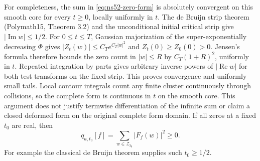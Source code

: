 For completeness, the sum in \eqref{eq:ns52-zero-form} is absolutely
convergent on this smooth core for every $t\ge0$, locally uniformly
in $t$. The de Bruijn strip theorem (Polymath15, Theorem 3.2) and
the unconditional initial critical strip give
$|\operatorname{Im} w|\le1/2$. For $0\le t\le T$, Gaussian
majorization of the super-exponentially decreasing $\Phi$ gives
$|Z_t(w)|\le C_T e^{C_T|w|^2}$ and $Z_t(0)\ge Z_0(0)>0$.
Jensen's formula therefore bounds the zero count in $|w|\le R$
by $C_T(1+R)^2$, uniformly in $t$. Repeated integration by parts
gives arbitrary inverse powers of $|\operatorname{Re}w|$ for both
test transforms on the fixed strip. This proves convergence and
uniformly small tails. Local contour integrals count any finite
cluster continuously through collisions, so the complete form is
continuous in $t$ on the smooth core. This argument does not justify
termwise differentiation of the infinite sum or claim a closed
deformed form on the original complete form domain.
If all zeros at a fixed $t_0$ are real, then
\[
 q_{a,t_0}[f]=\sum_{w\in\mathcal Z_{t_0}}|F_f(w)|^2\ge0.
\]
For example the classical de Bruijn theorem supplies such $t_0\ge1/2$.

